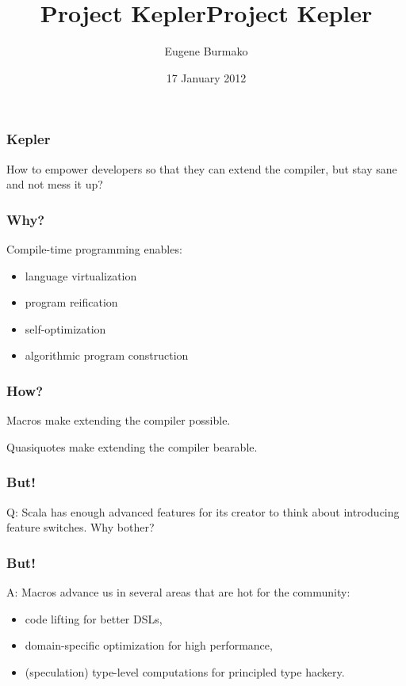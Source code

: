 \documentclass[hyperref={bookmarks=false}]{beamer}
\title{Project Kepler}
\begin{document}
\title{Project Kepler}
\author{Eugene Burmako}
\date{17 January 2012}
\maketitle

\begin{frame}[fragile]
\frametitle{Kepler}

How to empower developers so that they can extend the compiler, but stay sane and not mess it up?
\end{frame}

\begin{frame}[fragile]
\frametitle{Why?}

Compile-time programming enables:
\begin{itemize}
\item language virtualization
\item program reification
\item self-optimization
\item algorithmic program construction
\end{itemize}
\end{frame}

\begin{frame}[fragile]
\frametitle{How?}

Macros make extending the compiler possible.

Quasiquotes make extending the compiler bearable.
\end{frame}

\begin{frame}[fragile]
\frametitle{But!}

Q: Scala has enough advanced features for its creator to think about introducing feature switches.
Why bother?
\end{frame}

\begin{frame}[fragile]
\frametitle{But!}

A: Macros advance us in several areas that are hot for the community:
\begin{itemize}
\item code lifting for better DSLs,
\item domain-specific optimization for high performance,
\item (speculation) type-level computations for principled type hackery.
\end{itemize}
\end{frame}
\end{document}
